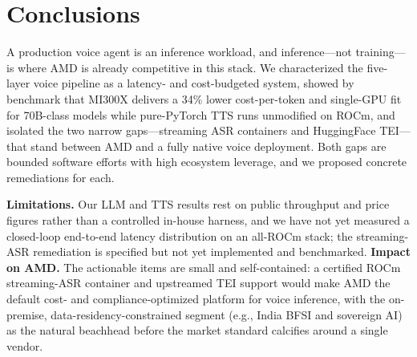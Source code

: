 \documentclass[blind]{gtac}
\begin{document}
\section{Conclusions}
A production voice agent is an inference workload, and inference---not training---is where AMD is already competitive in this stack. We characterized the five-layer voice pipeline as a latency- and cost-budgeted system, showed by benchmark that MI300X delivers a 34\% lower cost-per-token and single-GPU fit for 70B-class models while pure-PyTorch TTS runs unmodified on ROCm, and isolated the two narrow gaps---streaming ASR containers and HuggingFace TEI---that stand between AMD and a fully native voice deployment. Both gaps are bounded software efforts with high ecosystem leverage, and we proposed concrete remediations for each.

\textbf{Limitations.} Our LLM and TTS results rest on public throughput and price figures rather than a controlled in-house harness, and we have not yet measured a closed-loop end-to-end latency distribution on an all-ROCm stack; the streaming-ASR remediation is specified but not yet implemented and benchmarked. \textbf{Impact on AMD.} The actionable items are small and self-contained: a certified ROCm streaming-ASR container and upstreamed TEI support would make AMD the default cost- and compliance-optimized platform for voice inference, with the on-premise, data-residency-constrained segment (e.g., India BFSI and sovereign AI) as the natural beachhead before the market standard calcifies around a single vendor.

\begingroup
\let\itshape\upshape


\endgroup
\end{document}
